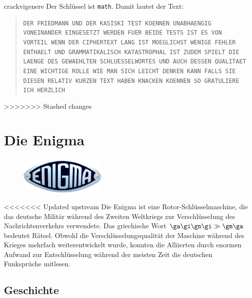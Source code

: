 \documentclass[%
<<<<<<< Updated upstream
11pt,%
twoside,%
titlepage,%
german,%
headsepline%
]{scrartcl}
\begin{document}
\begin{lsg}{crackvigenere}
    Der Schlüssel ist \texttt{math}. Damit lautet der Text:

    \begin{quote}
        \texttt{DER FRIEDMANN UND DER KASISKI TEST KOENNEN UNABHAENGIG VONEINANDER EINGESETZT WERDEN FUER BEIDE TESTS IST ES VON VORTEIL WENN DER CIPHERTEXT LANG IST MOEGLICHST WENIGE FEHLER ENTHAELT UND GRAMMATIKALISCH KATASTROPHAL IST ZUDEM SPIELT DIE LAENGE DES GEWAEHLTEN SCHLUESSELWORTES UND AUCH DESSEN QUALITAET EINE WICHTIGE ROLLE WIE MAN SICH LEICHT DENKEN KANN FALLS SIE DIESEN RELATIV KURZEN TEXT HABEN KNACKEN KOENNEN SO GRATULIERE ICH HERZLICH}
    \end{quote}
\end{lsg}
>>>>>>> Stashed changes

\clearpage

\section{Die Enigma}
\begin{figure}
\vspace{-15pt}
  \begin{center}
    \includegraphics[width=0.38\textwidth]{pictures/enigmalogo}
  \end{center}
\vspace{-0pt}
\end{figure}
<<<<<<< Updated upstream
Die Enigma ist eine Rotor-Schlüsselmaschine, die das deutsche Militär während des Zweiten Weltkriegs zur Verschlüsselung des Nachrichtenverkehrs verwendete. Das griechische Wort $\ga\gi\gn\gi\gg\gm\ga$ bedeutet \glqq Rätsel\grqq. Obwohl die Verschlüsselungsqualität der Maschine während des Krieges mehrfach weiterentwickelt wurde, konnten die Alliierten durch enormen Aufwand zur Entschlüsselung während der meisten Zeit die deutschen Funksprüche mitlesen.

\subsection{Geschichte}
\end{document}
